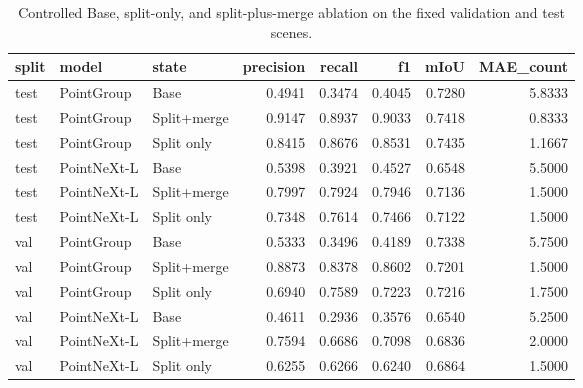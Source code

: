 \begin{table}
\caption{Controlled Base, split-only, and split-plus-merge ablation on the fixed validation and test scenes.}
\label{tab:ablation}
\begin{tabular}{lllrrrrr}
\toprule
split & model & state & precision & recall & f1 & mIoU & MAE\_count \\
\midrule
test & PointGroup & Base & 0.4941 & 0.3474 & 0.4045 & 0.7280 & 5.8333 \\
test & PointGroup & Split+merge & 0.9147 & 0.8937 & 0.9033 & 0.7418 & 0.8333 \\
test & PointGroup & Split only & 0.8415 & 0.8676 & 0.8531 & 0.7435 & 1.1667 \\
test & PointNeXt-L & Base & 0.5398 & 0.3921 & 0.4527 & 0.6548 & 5.5000 \\
test & PointNeXt-L & Split+merge & 0.7997 & 0.7924 & 0.7946 & 0.7136 & 1.5000 \\
test & PointNeXt-L & Split only & 0.7348 & 0.7614 & 0.7466 & 0.7122 & 1.5000 \\
val & PointGroup & Base & 0.5333 & 0.3496 & 0.4189 & 0.7338 & 5.7500 \\
val & PointGroup & Split+merge & 0.8873 & 0.8378 & 0.8602 & 0.7201 & 1.5000 \\
val & PointGroup & Split only & 0.6940 & 0.7589 & 0.7223 & 0.7216 & 1.7500 \\
val & PointNeXt-L & Base & 0.4611 & 0.2936 & 0.3576 & 0.6540 & 5.2500 \\
val & PointNeXt-L & Split+merge & 0.7594 & 0.6686 & 0.7098 & 0.6836 & 2.0000 \\
val & PointNeXt-L & Split only & 0.6255 & 0.6266 & 0.6240 & 0.6864 & 1.5000 \\
\bottomrule
\end{tabular}
\end{table}
